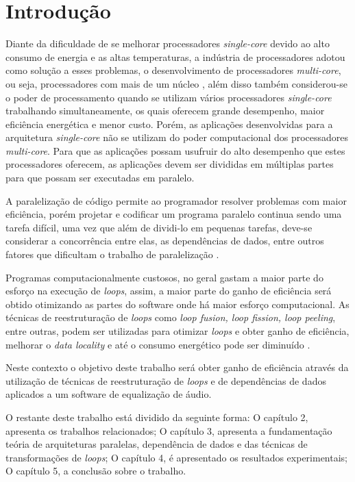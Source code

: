 \chapter{Introdução}

Diante da  dificuldade de se melhorar processadores \textit{single-core} devido 
ao alto consumo de energia e as altas temperaturas, a indústria de processadores 
adotou como solução a esses problemas, o desenvolvimento de processadores 
\textit{multi-core}, ou seja, processadores com mais de um núcleo \cite{aapc}, 
além disso também considerou-se o poder de processamento 
quando se utilizam vários processadores \textit{single-core} trabalhando 
simultaneamente, os quais oferecem grande desempenho, maior eficiência energética 
e menor custo.
Porém, as aplicações desenvolvidas para a arquitetura \textit{single-core} não 
se utilizam do poder computacional dos processadores \textit{multi-core}.
Para que as aplicações possam usufruir do alto desempenho que estes processadores 
oferecem, as aplicações devem ser divididas em múltiplas partes para que possam 
ser executadas em paralelo.

A paralelização de código permite ao programador resolver problemas com maior 
eficiência, porém projetar e codificar um programa paralelo continua sendo uma 
tarefa difícil, uma vez que além de dividi-lo em pequenas tarefas, deve-se 
considerar a concorrência entre elas, as dependências de dados, entre outros 
fatores que dificultam o trabalho de paralelização \cite{aipp}.

Programas computacionalmente custosos, no geral gastam a maior parte do esforço 
na execução de \textit{loops}, assim, a maior parte do ganho de eficiência será
obtido otimizando as partes do software onde há maior esforço computacional.
As técnicas de reestruturação de \textit{loops} como \textit{loop 
fusion, loop fission, loop peeling}, entre outras, podem ser utilizadas para
otimizar \textit{loops} e obter ganho de eficiência, melhorar o \textit{data
locality} e até o consumo energético pode ser diminuído \cite{Liu:2004}.

Neste contexto o objetivo deste trabalho será obter ganho de eficiência através da 
utilização de técnicas de reestruturação de \textit{loops} e de dependências de 
dados aplicados a um software de equalização de áudio.

O restante deste trabalho está dividido da seguinte forma: O capítulo 2,
  apresenta os trabalhos relacionados; O capítulo 3,
  apresenta a fundamentação teória de arquiteturas paralelas, dependência de
  dados e das técnicas de transformações de \textit{loops}; O capítulo 4, é  
  apresentado os resultados experimentais; O capítulo 5, a conclusão sobre o
  trabalho.
